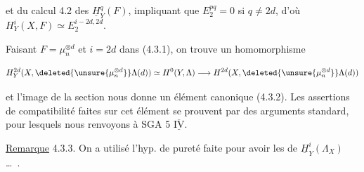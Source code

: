 et du calcul 4.2 des $\underline H^q_Y(F)$, impliquant que $E^{pq}_2=0$ si $q\ne 2d$, d'où $H^i_Y(X,F)\simeq E^{i-2d,2d}_2$.

Faisant  $F=\mu_n^{\otimes d}$ et $i=2d$ dans (4.3.1), on trouve un homomorphisme

\[
H^{2d}_Y(X,\deleted{\unsure{\mu_n^{\otimes d}}}\Lambda(d))\simeq H^0(Y,\Lambda)\longrightarrow H^{2d}(X,\deleted{\unsure{\mu_n^{\otimes d}}}\Lambda(d))
\]

et l'image de la section   nous donne un élément canonique (4.3.2). Les assertions  de compatibilité faites  sur cet élément  se prouvent par des arguments standard, pour lesquels nous renvoyons à SGA 5 $\overline{\underline{\mathrm{IV}}}$.

\uline{Remarque} 4.3.3. On a  utilisé l'hyp. de pureté faite pour  avoir  les  de $\underline H^i_Y(\Lambda_X)$ \ldots\ .
